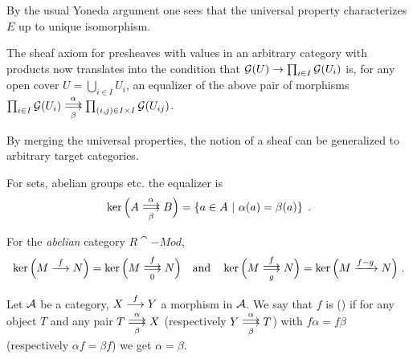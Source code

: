 \documentclass[a4paper,parskip=half,numbers=enddot, DIV=12]{scrreprt}
\begin{document}
	\begin{rem*}
		\begin{alphanumerate}
			\item By the usual Yoneda argument one sees that the universal property characterizes $E$ up to unique isomorphism.
			\item The sheaf axiom for presheaves with values in an arbitrary category with products now translates into the condition that $\mathcal{G}(U)\to\prod_{i\in I}\mathcal{G}(U_i)$ is, for any open cover $U=\bigcup_{i\in I}U_i$, an equalizer of the above pair of morphisms $\prod_{i\in I}\Gg(U_i)\doublemorphism[\alpha][\beta]\prod_{(i,j)\in I\times I}\Gg(U_{ij})$. 
			
			By merging the universal properties, the notion of a sheaf can be generalized to arbitrary target categories.
			\item For sets, abelian groups etc. the equalizer is 
			\begin{align*}
				\ker\Big(A\doublemorphism[\alpha][\beta]B\Big)=\left\{a\in A\st \alpha(a)=\beta(a)\right\}\;.
			\end{align*}
			\item For the \emph{abelian} category $R\cat{-Mod}$, 
			\begin{align*}
				\ker\Big(M\morphism[f]N\Big)=\ker\Big(M\doublemorphism[f][0]N\Big)\quad\text{and}\quad\ker\Big(M\doublemorphism[f][g]N\Big)=\ker\Big(M\xrightarrow{f-g}N\Big)\;.
			\end{align*}
		\end{alphanumerate}
	\end{rem*}
	\begin{defi}
		Let $\mathcal{A}$ be a category, $X\morphism[f] Y$ a morphism in $\mathcal{A}$. We say that $f$ is  () if for any object $T$ and any pair $T \doublemorphism[\alpha][\smash{\beta}] X$ (respectively $Y\doublemorphism[\smash{\alpha}][\beta] T$) with $f\alpha = f\beta$ (respectively $\alpha f= \beta f$) we get $\alpha =\beta$.
	\end{defi}
	
\end{document}
